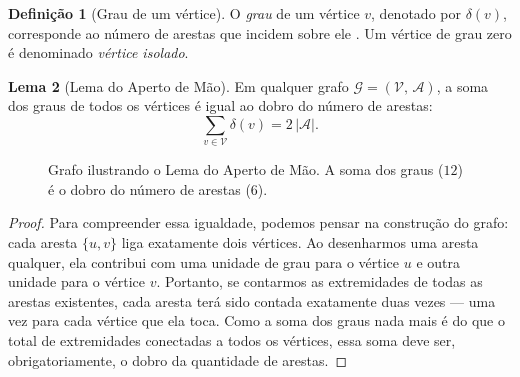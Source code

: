 \documentclass[
  12pt,
  oneside,
  a4paper,
  english,
  brazilian
  ]{abntex2}
\theoremstyle{definition}
\newtheorem{definicao}{Definição}[chapter]
\newtheorem{lema}[definicao]{Lema}
\begin{document}
\begin{definicao}[Grau de um vértice]
\label{def:grau}
  O \textit{grau} de um vértice $v$, denotado por $\delta(v)$, corresponde ao
  número de arestas que incidem sobre ele \cite{bondy1976}. Um vértice de grau
  zero é denominado \textit{vértice isolado}.
\end{definicao}

\begin{lema}[Lema do Aperto de Mão]
\label{lema:handshaking}
  Em qualquer grafo $\mathcal{G} = (\mathcal{V},\, \mathcal{A})$, a soma dos
  graus de todos os vértices é igual ao dobro do número de arestas:
  \begin{equation}
    \sum_{v \in \mathcal{V}} \delta(v) = 2\,|\mathcal{A}|.
    \label{eq:lema_aperto}
  \end{equation}
\end{lema}

\begin{figure}[htbp]
    \centering
    \caption{Grafo ilustrando o Lema do Aperto de Mão. A soma dos graus ($12$) é o dobro do número de arestas ($6$).}
    \label{fig:aperto_mao}
\end{figure}

\begin{proof}
  Para compreender essa igualdade, podemos pensar na construção do grafo: cada aresta $\{u, v\}$ liga exatamente dois vértices. Ao desenharmos uma aresta qualquer, ela contribui com uma unidade de grau para o vértice $u$ e outra unidade para o vértice $v$. Portanto, se contarmos as extremidades de todas as arestas existentes, cada aresta terá sido contada exatamente duas vezes — uma vez para cada vértice que ela toca. Como a soma dos graus nada mais é do que o total de extremidades conectadas a todos os vértices, essa soma deve ser, obrigatoriamente, o dobro da quantidade de arestas.
\end{proof}
\end{document}
